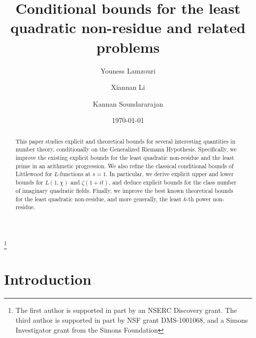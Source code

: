 \documentclass [12pt]{amsart}
\numberwithin{equation}{section}
\begin{document}
\title{Conditional bounds for the least quadratic non-residue and related problems}

\author{Youness Lamzouri}
\address{Department of Mathematics and Statistics, York University,
4700 Keele Street,
Toronto, ON, M3J1P3}

\author{Xiannan Li}
\address{Department of Mathematics, University of Illinois at Urbana-Champaign,
1409 W. Green Street,
Urbana, IL, 61801}

\author{Kannan Soundararajan}
\address{Department of Mathematics, Stanford University, Stanford, CA 94305}




\date{\today}
\begin{abstract} This paper studies explicit and theoretical bounds for several interesting quantities in number theory, conditionally on the Generalized Riemann Hypothesis.  Specifically, we improve the existing explicit bounds for the least quadratic non-residue and the least prime in an arithmetic progression. We also refine the classical conditional bounds of Littlewood for $L$-functions at $s=1$. In particular, we derive explicit upper and lower bounds for $L(1,\chi)$ and $\zeta(1+it)$, and deduce explicit bounds for the class number of imaginary quadratic fields.  Finally, we improve the best known theoretical bounds for the least quadratic non-residue, and more generally, the least $k$-th power non-residue.
\end{abstract}

\thanks{The first author is supported in part by an NSERC Discovery grant. The third author is supported in part by NSF grant DMS-1001068, and a Simons Investigator grant from the Simons Foundation}

\maketitle

\section{Introduction}
\end{document}
